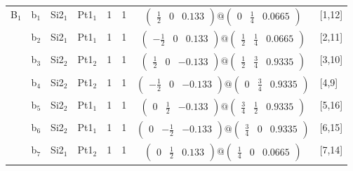 \documentclass[fleqn,10pt,landscape]{article}
\begin{document}
\begin{itemize}
\begin{center}
\begin{longtable}{cc|cc|c|c|c|l}
B$_{1}$ & b$_{1}$ & Si2$_{1}$ & Pt1$_{1}$ & 1 & 1 & $\begin{pmatrix} \frac{1}{2} & 0 & 0.133 \end{pmatrix}@\begin{pmatrix} 0 & \frac{1}{4} & 0.0665 \end{pmatrix}$ & [1,12] \\
& b$_{2}$ & Si2$_{1}$ & Pt1$_{1}$ & 1 & 1 & $\begin{pmatrix} - \frac{1}{2} & 0 & 0.133 \end{pmatrix}@\begin{pmatrix} \frac{1}{2} & \frac{1}{4} & 0.0665 \end{pmatrix}$ & [2,11] \\
& b$_{3}$ & Si2$_{2}$ & Pt1$_{2}$ & 1 & 1 & $\begin{pmatrix} \frac{1}{2} & 0 & -0.133 \end{pmatrix}@\begin{pmatrix} \frac{1}{2} & \frac{3}{4} & 0.9335 \end{pmatrix}$ & [3,10] \\
& b$_{4}$ & Si2$_{2}$ & Pt1$_{2}$ & 1 & 1 & $\begin{pmatrix} - \frac{1}{2} & 0 & -0.133 \end{pmatrix}@\begin{pmatrix} 0 & \frac{3}{4} & 0.9335 \end{pmatrix}$ & [4,9] \\
& b$_{5}$ & Si2$_{2}$ & Pt1$_{1}$ & 1 & 1 & $\begin{pmatrix} 0 & \frac{1}{2} & -0.133 \end{pmatrix}@\begin{pmatrix} \frac{3}{4} & \frac{1}{2} & 0.9335 \end{pmatrix}$ & [5,16] \\
& b$_{6}$ & Si2$_{2}$ & Pt1$_{1}$ & 1 & 1 & $\begin{pmatrix} 0 & - \frac{1}{2} & -0.133 \end{pmatrix}@\begin{pmatrix} \frac{3}{4} & 0 & 0.9335 \end{pmatrix}$ & [6,15] \\
& b$_{7}$ & Si2$_{1}$ & Pt1$_{2}$ & 1 & 1 & $\begin{pmatrix} 0 & \frac{1}{2} & 0.133 \end{pmatrix}@\begin{pmatrix} \frac{1}{4} & 0 & 0.0665 \end{pmatrix}$ & [7,14] \\

\end{longtable}
\end{center}
\end{itemize}
\end{document}
